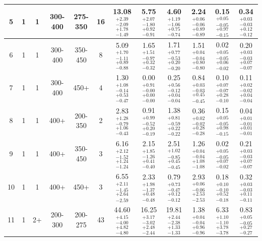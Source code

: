 \begin{landscape}
\begin{table}[hp]
\begin{lrbox}{\resBox}
\begin{tabular}{|c|c|c|c|c||c|c||c|c|c|c|c|}
 \hline
              5 &               1 &               1 &         300-400 &         275-350  &     16 &  13.08 $^{+2.39}_{-2.09}$ $^{+1.78}_{-1.49}$ &   5.75 $^{+2.07}_{-1.80}$ $^{+0.92}_{-0.91}$ &   4.60 $^{+1.19}_{-1.06}$ $^{+0.75}_{-0.74}$ &   2.24 $^{+0.06}_{-0.06}$ $^{+0.89}_{-0.89}$ &   0.15 $^{+0.05}_{-0.05}$ $^{+0.97}_{-0.15}$ &   0.34 $^{+0.03}_{-0.03}$ $^{+0.12}_{-0.12}$ \\
 \hline
              6 &               1 &               1 &         300-400 &         350-450  &      8 &   5.09 $^{+1.70}_{-1.11}$ $^{+0.89}_{-0.88}$ &   1.65 $^{+1.51}_{-0.97}$ $^{+0.32}_{-0.32}$ &   1.71 $^{+0.77}_{-0.53}$ $^{+0.20}_{-0.20}$ &   1.51 $^{+0.04}_{-0.04}$ $^{+0.80}_{-0.80}$ &   0.02 $^{+0.05}_{-0.05}$ $^{+0.06}_{-0.02}$ &   0.20 $^{+0.03}_{-0.03}$ $^{+0.07}_{-0.07}$ \\
 \hline
              7 &               1 &               1 &         300-400 &            450+  &      4 &   1.30 $^{+1.08}_{-0.14}$ $^{+0.53}_{-0.47}$ &   0.00 $^{+0.91}_{-0.00}$ $^{+0.00}_{-0.00}$ &   0.25 $^{+0.56}_{-0.12}$ $^{+0.04}_{-0.04}$ &   0.84 $^{+0.03}_{-0.03}$ $^{+0.45}_{-0.45}$ &   0.10 $^{+0.07}_{-0.07}$ $^{+0.28}_{-0.10}$ &   0.11 $^{+0.02}_{-0.02}$ $^{+0.04}_{-0.04}$ \\
 \hline
              8 &               1 &               1 &            400+ &         200-350  &      2 &   2.83 $^{+1.28}_{-0.79}$ $^{+1.06}_{-0.43}$ &   0.91 $^{+0.99}_{-0.52}$ $^{+0.20}_{-0.19}$ &   1.38 $^{+0.81}_{-0.59}$ $^{+0.22}_{-0.22}$ &   0.36 $^{+0.02}_{-0.02}$ $^{+0.28}_{-0.28}$ &   0.15 $^{+0.05}_{-0.05}$ $^{+0.98}_{-0.15}$ &   0.04 $^{+0.01}_{-0.01}$ $^{+0.01}_{-0.01}$ \\
 \hline
              9 &               1 &               1 &            400+ &         350-450  &      3 &   6.16 $^{+2.12}_{-1.52}$ $^{+1.24}_{-1.24}$ &   2.15 $^{+1.85}_{-1.26}$ $^{+0.41}_{-0.40}$ &   2.51 $^{+1.02}_{-0.85}$ $^{+0.45}_{-0.45}$ &   1.26 $^{+0.04}_{-0.04}$ $^{+1.08}_{-1.08}$ &   0.02 $^{+0.05}_{-0.05}$ $^{+0.07}_{-0.02}$ &   0.21 $^{+0.03}_{-0.03}$ $^{+0.07}_{-0.07}$ \\
 \hline
             10 &               1 &               1 &            400+ &            450+  &      3 &   6.55 $^{+2.11}_{-1.45}$ $^{+2.64}_{-2.59}$ &   2.33 $^{+1.98}_{-1.37}$ $^{+0.48}_{-0.48}$ &   0.79 $^{+0.73}_{-0.47}$ $^{+0.12}_{-0.12}$ &   2.93 $^{+0.06}_{-0.06}$ $^{+2.53}_{-2.53}$ &   0.18 $^{+0.10}_{-0.10}$ $^{+0.52}_{-0.18}$ &   0.32 $^{+0.03}_{-0.03}$ $^{+0.11}_{-0.11}$ \\
 \hline
             11 &               1 &              2+ &         200-300 &         200-275  &     43 &  44.60 $^{+4.15}_{-4.00}$ $^{+4.82}_{-4.80}$ &  16.25 $^{+3.17}_{-3.02}$ $^{+2.48}_{-2.44}$ &  19.81 $^{+2.44}_{-2.38}$ $^{+1.33}_{-1.33}$ &   1.38 $^{+0.04}_{-0.04}$ $^{+0.96}_{-0.96}$ &   6.33 $^{+1.10}_{-1.10}$ $^{+3.78}_{-3.78}$ &   0.83 $^{+0.05}_{-0.05}$ $^{+0.27}_{-0.27}$ \\

\end{tabular}
\end{lrbox}
\end{table}
\end{landscape}
